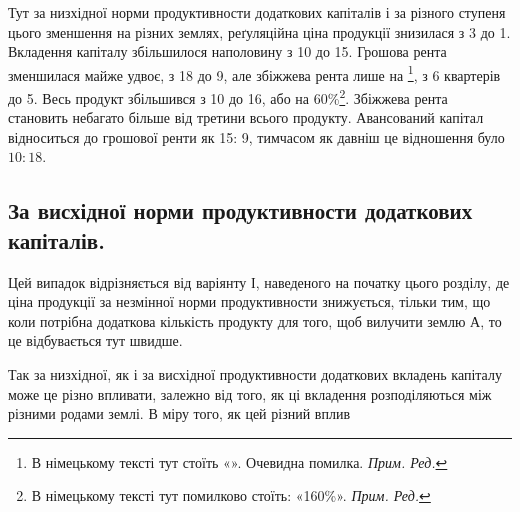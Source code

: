 
Тут за низхідної норми продуктивности додаткових капіталів і за різного
ступеня цього зменшення на різних землях, реґуляційна ціна продукції знизилася
з 3 до 1. Вкладення капіталу збільшилося наполовину з 10 до 15. Грошова рента зменшилася майже удвоє, з 18 до 9, але збіжжева рента лише на  \footnote*{
В німецькому тексті тут стоїть «». Очевидна помилка. \emph{Прим. Ред.}
}, з 6 квартерів до 5. Весь продукт
збільшився з 10 до 16, або на 60\%\footnote*{
В німецькому тексті тут помилково стоїть: «160\%». \emph{Прим. Ред.}
}. Збіжжева рента становить небагато більше
від третини всього продукту. Авансований капітал відноситься до грошової ренти
як 15: 9, тимчасом як давніш це відношення було $10:18$.

\subsection{За висхідної норми продуктивности додаткових капіталів.}

Цей випадок відрізняється від варіянту І, наведеного на початку цього
розділу, де ціна продукції за незмінної норми продуктивности знижується, тільки
тим, що коли потрібна додаткова кількість продукту для того, щоб вилучити
землю $А$, то це відбувається тут швидше.

Так за низхідної, як і за висхідної продуктивности додаткових вкладень
капіталу може це різно впливати, залежно від того, як ці вкладення розподіляються
між різними родами землі. В міру того, як цей різний вплив
\parbreak{}  %
